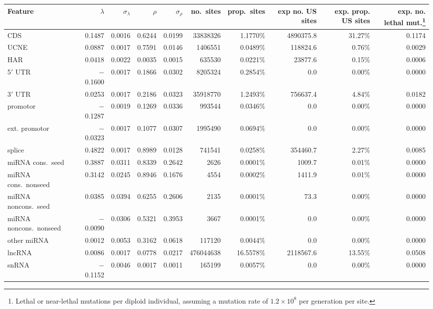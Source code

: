 \documentclass[11pt]{article}
\begin{document}
\begin{landscape}
\begin{table}
  \begin{footnotesize}
  \begin{tabular}{lrrrrrrrrr}
  \hline
  Feature	& $\lambda$ & $\sigma_\lambda$ &	$\rho$ & $\sigma_\rho$	&no.\ sites	& prop.\ sites&	exp no. US sites & exp. prop. US sites &exp. no. lethal mut.\footnote{Lethal or near-lethal mutations per diploid individual, assuming a mutation rate of $1.2\times 10^8$ per generation per site.}\\
  \hline
CDS & 0.1487 & 0.0016 & 0.6244 & 0.0199 & 33838326 & 1.1770\% & 4890375.8 & 31.27\% & 0.1174\\
UCNE & 0.0887 & 0.0017 & 0.7591 & 0.0146 & 1406551 & 0.0489\% & 118824.6 & 0.76\% & 0.0029\\
HAR & 0.0418 & 0.0022 & 0.0035 & 0.0015 & 635530 & 0.0221\% & 23877.6 & 0.15\% & 0.0006\\
5$'$ UTR & $-$0.1600 & 0.0017 & 0.1866 & 0.0302 & 8205324 & 0.2854\% & 0.0 & 0.00\% & 0.0000\\
3$'$ UTR & 0.0253 & 0.0017 & 0.2186 & 0.0323 & 35918770 & 1.2493\% & 756637.4 & 4.84\% & 0.0182\\
promotor & $-$0.1287 & 0.0019 & 0.1269 & 0.0336 & 993544 & 0.0346\% & 0.0 & 0.00\% & 0.0000\\
ext. promotor  & $-$0.0323 & 0.0017 & 0.1077 & 0.0307 & 1995490 & 0.0694\% & 0.0 & 0.00\% & 0.0000\\
splice & 0.4822 & 0.0017 & 0.8989 & 0.0128 & 741541 & 0.0258\% & 354460.7 & 2.27\% & 0.0085\\
miRNA cons.\ seed & 0.3887 & 0.0311 & 0.8339 & 0.2642 & 2626 & 0.0001\% & 1009.7 & 0.01\% & 0.0000\\
miRNA cons.\ nonseed & 0.3142 & 0.0245 & 0.8946 & 0.1676 & 4554 & 0.0002\% & 1411.9 & 0.01\% & 0.0000\\
miRNA noncons.\ seed & 0.0385 & 0.0394 & 0.6255 & 0.2606 & 2135 & 0.0001\% & 73.3 & 0.00\% & 0.0000\\
miRNA noncons.\ nonseed & $-$0.0090 & 0.0306 & 0.5321 & 0.3953 & 3667 & 0.0001\% & 0.0 & 0.00\% & 0.0000\\
other miRNA & 0.0012 & 0.0053 & 0.3162 & 0.0618 & 117120 & 0.0044\% & 0.0 & 0.00\% & 0.0000\\
lncRNA & 0.0086 & 0.0017 & 0.0778 & 0.0217 & 476044638 & 16.5578\% &  2118567.6 & 13.55\% & 0.0508\\
snRNA & $-$0.1152 & 0.0046 & 0.0017 & 0.0011 & 165199 & 0.0057\% & 0.0 & 0.00\% & 0.0000\\

\end{tabular}
\end{footnotesize}
\end{table}
\end{landscape}
\end{document}
